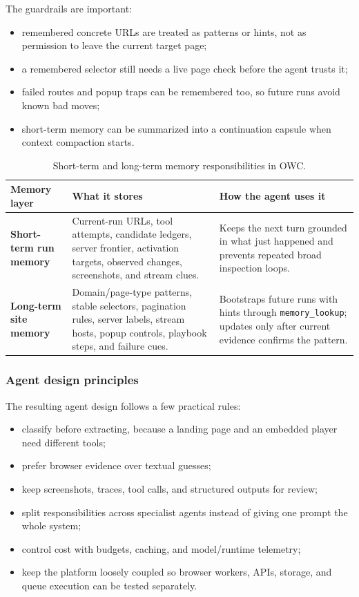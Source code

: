 The guardrails are important:
\begin{itemize}
  \item remembered concrete URLs are treated as patterns or hints, not as permission to
  leave the current target page;
  \item a remembered selector still needs a live page check before the agent trusts it;
  \item failed routes and popup traps can be remembered too, so future runs avoid known
  bad moves;
  \item short-term memory can be summarized into a continuation capsule when context
  compaction starts.
\end{itemize}

\begin{table}[H]
\centering
\begin{tabularx}{\textwidth}{>{\raggedright\arraybackslash\bfseries}p{3.1cm}
                              >{\raggedright\arraybackslash}X
                              >{\raggedright\arraybackslash}X}
\toprule
\rowcolor{accent!8}
Memory layer & What it stores & How the agent uses it \\
\midrule
Short-term run memory & Current-run URLs, tool attempts, candidate ledgers, server
frontier, activation targets, observed changes, screenshots, and stream clues. &
Keeps the next turn grounded in what just happened and prevents repeated broad
inspection loops. \\
Long-term site memory & Domain/page-type patterns, stable selectors, pagination rules,
server labels, stream hosts, popup controls, playbook steps, and failure cues. &
Bootstraps future runs with hints through \texttt{memory\_lookup}; updates only after
current evidence confirms the pattern. \\
\bottomrule
\end{tabularx}
\caption{Short-term and long-term memory responsibilities in OWC.}\label{tab:memory-layers}
\end{table}

\subsubsection{Agent design principles}

The resulting agent design follows a few practical rules:

\begin{itemize}
  \item classify before extracting, because a landing page and an embedded player need
  different tools;
  \item prefer browser evidence over textual guesses;
  \item keep screenshots, traces, tool calls, and structured outputs for review;
  \item split responsibilities across specialist agents instead of giving one prompt the
  whole system;
  \item control cost with budgets, caching, and model/runtime telemetry;
  \item keep the platform loosely coupled so browser workers, APIs, storage, and queue
  execution can be tested separately.
\end{itemize}

